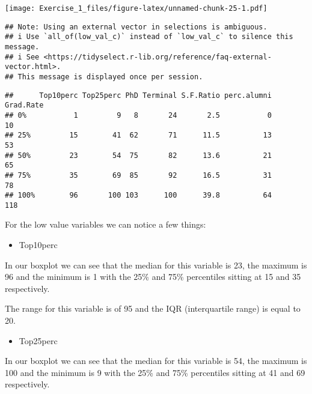 \documentclass[]{article}
\newenvironment{Shaded}{\begin{snugshade}}{\end{snugshade}}
\newcommand{\CommentTok}[1]{\textcolor[rgb]{0.56,0.35,0.01}{\textit{#1}}}
\newcommand{\DataTypeTok}[1]{\textcolor[rgb]{0.13,0.29,0.53}{#1}}
\newcommand{\KeywordTok}[1]{\textcolor[rgb]{0.13,0.29,0.53}{\textbf{#1}}}
\newcommand{\NormalTok}[1]{#1}
\newcommand{\OperatorTok}[1]{\textcolor[rgb]{0.81,0.36,0.00}{\textbf{#1}}}
\newcommand{\OtherTok}[1]{\textcolor[rgb]{0.56,0.35,0.01}{#1}}
\newcommand{\StringTok}[1]{\textcolor[rgb]{0.31,0.60,0.02}{#1}}
\providecommand{\tightlist}{%
  \setlength{\itemsep}{0pt}\setlength{\parskip}{0pt}}
\begin{document}
\texttt{[image: Exercise\_1\_files/figure-latex/unnamed-chunk-25-1.pdf]}

\begin{Shaded}
\end{Shaded}

\begin{verbatim}
## Note: Using an external vector in selections is ambiguous.
## i Use `all_of(low_val_c)` instead of `low_val_c` to silence this message.
## i See <https://tidyselect.r-lib.org/reference/faq-external-vector.html>.
## This message is displayed once per session.
\end{verbatim}

\begin{verbatim}
##      Top10perc Top25perc PhD Terminal S.F.Ratio perc.alumni Grad.Rate
## 0%           1         9   8       24       2.5           0        10
## 25%         15        41  62       71      11.5          13        53
## 50%         23        54  75       82      13.6          21        65
## 75%         35        69  85       92      16.5          31        78
## 100%        96       100 103      100      39.8          64       118
\end{verbatim}

For the low value variables we can notice a few things:

\begin{itemize}
\tightlist
\item
  Top10perc
\end{itemize}

In our boxplot we can see that the median for this variable is 23, the
maximum is 96 and the minimum is 1 with the 25\% and 75\% percentiles
sitting at 15 and 35 respectively.

The range for this variable is of 95 and the IQR (interquartile range)
is equal to 20.

\begin{itemize}
\tightlist
\item
  Top25perc
\end{itemize}

In our boxplot we can see that the median for this variable is 54, the
maximum is 100 and the minimum is 9 with the 25\% and 75\% percentiles
sitting at 41 and 69 respectively.
\end{document}
